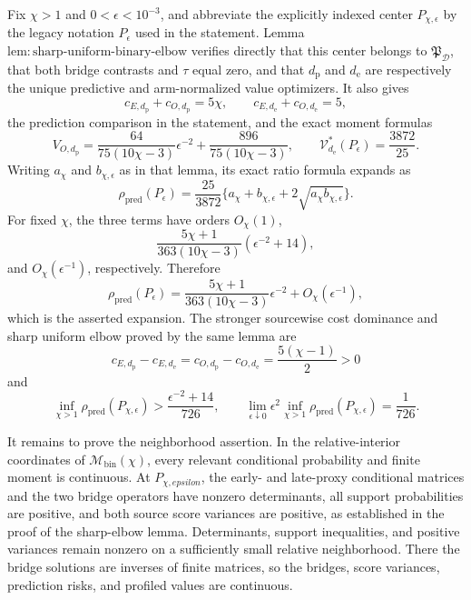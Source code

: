 Fix \(\chi>1\) and \(0<\epsilon<10^{-3}\), and abbreviate the explicitly indexed center \(P_{\chi,\epsilon}\) by the legacy notation \(P_\epsilon\) used in the statement. Lemma~\(\mathrm{lem{:}sharp\text{-}uniform\text{-}binary\text{-}elbow}\) verifies directly that this center belongs to \(\mathfrak P_{\mathcal D}\), that both bridge contrasts and \(\tau\) equal zero, and that \(d_{\mathrm p}\) and \(d_{\mathrm e}\) are respectively the unique predictive and arm-normalized value optimizers. It also gives
\[
 c_{E,d_{\mathrm p}}+c_{O,d_{\mathrm p}}=5\chi,
 \qquad
 c_{E,d_{\mathrm e}}+c_{O,d_{\mathrm e}}=5,
\]
the prediction comparison in the statement, and the exact moment formulas
\[
 V_{O,d_{\mathrm p}}
 =\frac{64}{75(10\chi-3)}\epsilon^{-2}
 +\frac{896}{75(10\chi-3)},
 \qquad
 \mathcal V_{d_{\mathrm e}}^*(P_\epsilon)=\frac{3872}{25}.
\]
Writing \(a_\chi\) and \(b_{\chi,\epsilon}\) as in that lemma, its exact ratio formula expands as
\[
 \rho_{\mathrm{pred}}(P_\epsilon)
 =\frac{25}{3872}
 \{a_\chi+b_{\chi,\epsilon}+2\sqrt{a_\chi b_{\chi,\epsilon}}\}.
\]
For fixed \(\chi\), the three terms have orders \(O_\chi(1)\),
\[
 \frac{5\chi+1}{363(10\chi-3)}(\epsilon^{-2}+14),
\]
and \(O_\chi(\epsilon^{-1})\), respectively. Therefore
\[
 \rho_{\mathrm{pred}}(P_\epsilon)
 =\frac{5\chi+1}{363(10\chi-3)}\epsilon^{-2}
 +O_\chi(\epsilon^{-1}),
\]
which is the asserted expansion. The stronger sourcewise cost dominance and sharp uniform elbow proved by the same lemma are
\[
 c_{E,d_{\mathrm p}}-c_{E,d_{\mathrm e}}
 =c_{O,d_{\mathrm p}}-c_{O,d_{\mathrm e}}
 =\frac{5(\chi-1)}2>0
\]
and
\[
 \inf_{\chi>1}\rho_{\mathrm{pred}}(P_{\chi,\epsilon})
 >\frac{\epsilon^{-2}+14}{726},
 \qquad
 \lim_{\epsilon\downarrow0}\epsilon^2
 \inf_{\chi>1}\rho_{\mathrm{pred}}(P_{\chi,\epsilon})
 =\frac1{726}.                                         \tag{1}
\]

It remains to prove the neighborhood assertion. In the relative-interior coordinates of \(\mathcal M_{\mathrm{bin}}(\chi)\), every relevant conditional probability and finite moment is continuous. At \(P_{\chi,epsilon}\), the early- and late-proxy conditional matrices and the two bridge operators have nonzero determinants, all support probabilities are positive, and both source score variances are positive, as established in the proof of the sharp-elbow lemma. Determinants, support inequalities, and positive variances remain nonzero on a sufficiently small relative neighborhood. There the bridge solutions are inverses of finite matrices, so the bridges, score variances, prediction risks, and profiled values are continuous.

